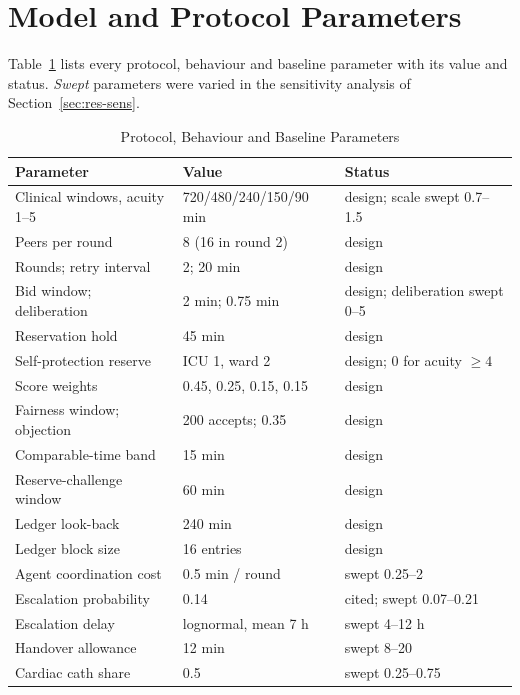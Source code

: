 
\section{Model and Protocol Parameters}
\label{app:params}
Table~\ref{tab:params} lists every protocol, behaviour and baseline parameter with its value and status. \emph{Swept} parameters were varied in the sensitivity analysis of Section~\ref{sec:res-sens}.

\begin{table}[!h]
\centering
\caption{Protocol, Behaviour and Baseline Parameters}
\label{tab:params}
\scriptsize
\setlength{\tabcolsep}{3pt}
\begin{tabular}{@{}p{2.9cm}p{2.2cm}p{2.6cm}@{}}
\toprule
Parameter & Value & Status \\
\midrule
Clinical windows, acuity 1--5 & 720/480/240/150/90 min & design; scale swept 0.7--1.5 \\
Peers per round & 8 (16 in round 2) & design \\
Rounds; retry interval & 2; 20 min & design \\
Bid window; deliberation & 2 min; 0.75 min & design; deliberation swept 0--5 \\
Reservation hold & 45 min & design \\
Self-protection reserve & ICU 1, ward 2 & design; 0 for acuity $\ge4$ \\
Score weights & 0.45, 0.25, 0.15, 0.15 & design \\
Fairness window; objection & 200 accepts; 0.35 & design \\
Comparable-time band & 15 min & design \\
Reserve-challenge window & 60 min & design \\
Ledger look-back & 240 min & design \\
Ledger block size & 16 entries & design \\
Agent coordination cost & 0.5 min / round & swept 0.25--2 \\
Escalation probability & 0.14 & cited; swept 0.07--0.21 \\
Escalation delay & lognormal, mean 7 h & swept 4--12 h \\
Handover allowance & 12 min & swept 8--20 \\
Cardiac cath share & 0.5 & swept 0.25--0.75 \\

\end{tabular}
\end{table}
